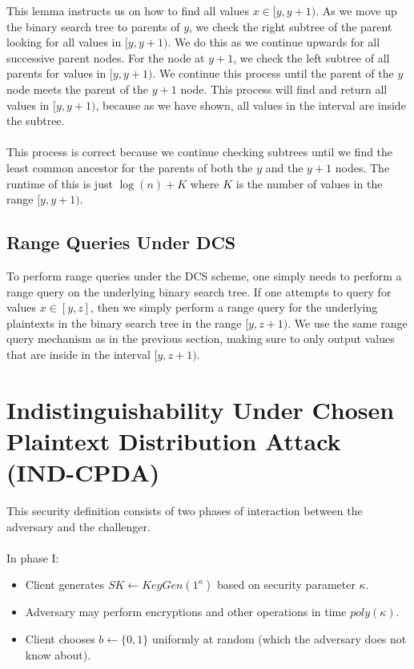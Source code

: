 \documentclass[12pt]{article}
\begin{document}
This lemma instructs us on how to find all values $x \in [y, y+1)$. As we move up the binary search tree to parents of $y$, we check the right subtree of the parent looking for all values in $[y, y+1)$. We do this as we continue upwards for all successive parent nodes. For the node at $y+1$, we check the left subtree of all parents for values in $[y, y+1)$. We continue this process until the parent of the $y$ node meets the parent of the $y+1$ node. This process will find and return all values in $[y, y+1)$, because as we have shown, all values in the interval are inside the subtree. \\ \\
This process is correct because we continue checking subtrees until we find the least common ancestor for the parents of both the $y$ and the $y+1$ nodes. The runtime of this is just $\log(n) + K$ where $K$ is the number of values in the range $[y, y+1)$.

  \subsection{Range Queries Under DCS}

  To perform range queries under the DCS scheme, one simply needs to perform a range query on the underlying binary search tree. If one attempts to query for values $x \in [y, z]$, then we simply perform a range query for the underlying plaintexts in the binary search tree in the range $[y, z+1)$. We use the same range query mechanism as in the previous section, making sure to only output values that are inside in the interval $[y, z+1)$.
\section{Indistinguishability Under Chosen Plaintext Distribution Attack (IND-CPDA)}
This security definition consists of two phases of interaction between the adversary and the challenger. \\ \\
In phase I:
\begin{itemize}
  \item Client generates $SK \leftarrow KeyGen(1^\kappa)$ based on security parameter $\kappa$.
  \item Adversary may perform encryptions and other operations in time $poly(\kappa)$.
  \item Client chooses $b \leftarrow \{0,1\}$ uniformly at random (which the adversary does not know about).
\end{itemize} 
\end{document}
